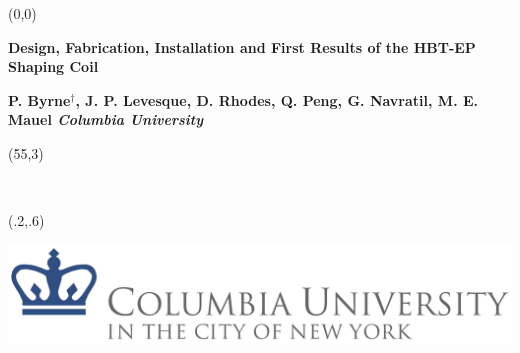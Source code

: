 \documentclass{article}
\begin{document}

%


%


\begin{textblock}{70}(0,0)


\begin{center}

\vspace{5mm}\def\myfig#1{\begin{center}\texttt{[image: \#1]}\end{center}}

{\veryHuge\color{black} \textbf{Design, Fabrication, Installation and First Results of the HBT-EP Shaping Coil}}

\vspace{15mm}

\LARGE\textbf{\color{lnavy}
P. Byrne$^\dagger$, J. P. Levesque, D. Rhodes, Q. Peng, G. Navratil, M. E. Mauel \hspace{2in} \emph{Columbia University}}\\

\vspace{5mm}

\end{center}
\end{textblock}
\begin{textblock}{12}(55,3)
\begin{flushright}

\hspace{950mm}{$^*$Supported by U.~S.~DOE Grant DE-FG02-86ER53222. }\hspace{1in}\\
\hspace{1in}

\end{flushright}
\end{textblock}

\begin{textblock}{3}(.2,.6)

\includegraphics[scale =.75]{CU_logo_exported.png}

\end{textblock}
\end{document}

